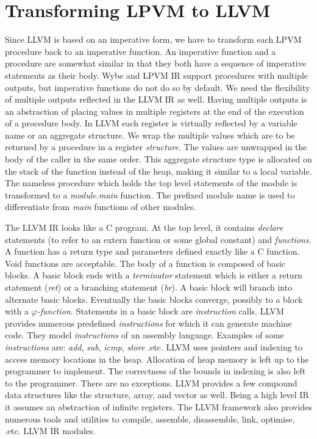 \section{Transforming LPVM to LLVM}
\label{sec:lpvm_to_llvm}

Since LLVM is based on an imperative form, we have to transform each LPVM
procedure back to an imperative function. An imperative function and a
procedure are somewhat similar in that they both have a sequence of imperative
statements as their body. Wybe and LPVM IR support procedures with multiple
outputs, but imperative functions do not do so by default. We need the
flexibility of multiple outputs reflected in the LLVM IR as well. Having
multiple outputs is an abstraction of placing values in multiple registers at
the end of the execution of a procedure body. In LLVM each register is
virtually reflected by a variable name or an aggregate structure. We wrap the
multiple values which are to be returned by a procedure in a register
\textit{structure}. The values are unwrapped in the body of the caller in the
same order. This aggregate structure type is allocated on the stack of the
function instead of the heap, making it similar to a local variable. The
nameless procedure which holds the top level statements of the module is
transformed to a \textit{module.main} function. The prefixed module name is
used to differentiate from \textit{main} functions of other modules.

The LLVM IR looks like a C program. At the top level, it contains
\textit{declare} statements (to refer to an extern function or some global
constant) and \textit{functions}. A function has a return type and parameters
defined exactly like a C function. Void functions are acceptable. The body of a
function is composed of basic blocks. A basic block ends with a
\textit{terminator} statement which is either a return statement
(\textit{ret}) or a branching statement (\textit{br}). A basic block will branch
into alternate basic blocks. Eventually the basic blocks converge, possibly to
a block with a $\varphi$\textit{-function}. Statements in a basic block are
\textit{instruction} calls. LLVM provides numerous predefined
\textit{instructions} for which it can generate machine code. They model
\textit{instructions} of an assembly language. Examples of some
\textit{instructions} are: \textit{add}, \textit{sub}, \textit{icmp},
\textit{store} .etc. LLVM uses pointers and indexing to access memory locations
in the heap. Allocation of heap memory is left up to the programmer to
implement. The correctness of the bounds in indexing is also left to the
programmer. There are no exceptions. LLVM provides a few compound data
structures like the structure, array, and vector as well. Being a high level IR
it assumes an abstraction of infinite registers. The LLVM framework also
provides numerous tools and utilities to compile, assemble, disassemble, link,
optimise, .etc. LLVM IR modules.

